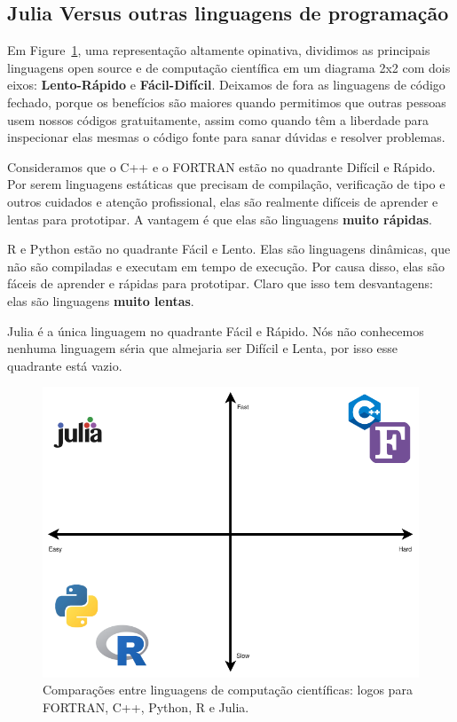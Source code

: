 \documentclass[
  notoc %
]{tufte-book}
\begin{document}
\hypertarget{julia-versus-outras-linguagens-de-programauxe7uxe3o}{%
\subsection{Julia Versus outras linguagens de
programação}\label{julia-versus-outras-linguagens-de-programauxe7uxe3o}}

Em Figure~\ref{fig:language_comparison}, uma representação altamente
opinativa, dividimos as principais linguagens open source e de
computação científica em um diagrama 2x2 com dois eixos:
\textbf{Lento-Rápido} e \textbf{Fácil-Difícil}. Deixamos de fora as
linguagens de código fechado, porque os benefícios são maiores quando
permitimos que outras pessoas usem nossos códigos gratuitamente, assim
como quando têm a liberdade para inspecionar elas mesmas o código fonte
para sanar dúvidas e resolver problemas.

Consideramos que o C++ e o FORTRAN estão no quadrante Difícil e Rápido.
Por serem linguagens estáticas que precisam de compilação, verificação
de tipo e outros cuidados e atenção profissional, elas são realmente
difíceis de aprender e lentas para prototipar. A vantagem é que elas são
linguagens \textbf{muito rápidas}.

R e Python estão no quadrante Fácil e Lento. Elas são linguagens
dinâmicas, que não são compiladas e executam em tempo de execução. Por
causa disso, elas são fáceis de aprender e rápidas para prototipar.
Claro que isso tem desvantagens: elas são linguagens \textbf{muito
lentas}.

Julia é a única linguagem no quadrante Fácil e Rápido. Nós não
conhecemos nenhuma linguagem séria que almejaria ser Difícil e Lenta,
por isso esse quadrante está vazio.

\begin{figure}
\hypertarget{fig:language_comparison}{%
\centering
\includegraphics{images/language_comparisons.png}
\caption{Comparações entre linguagens de computação científicas: logos
para FORTRAN, C++, Python, R e Julia.}\label{fig:language_comparison}
}
\end{figure}
\end{document}
